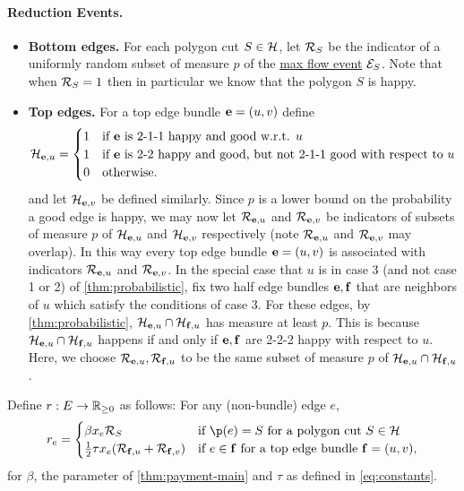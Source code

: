 \paragraph{Reduction Events.} %
\begin{itemize}
\item \textbf{Bottom edges.} \hypertarget{reduction-events}{For each polygon cut}  $S\in\mathcal{H}$, let ${\mathcal{R}}_S$ be the indicator of a uniformly random subset of measure $p$ of the \hyperlink{tar:max-flow-event}{max flow event} ${\cal E}_S$. Note that when ${\mathcal{R}}_S=1$ then in particular we know that the polygon $S$ is happy.\label{def:RS}
\item \textbf{Top edges.} \label{def:Reu} For a top edge bundle ${\bf e}=(u,v)$ define
$$\cH_{\bbe,u} = \begin{cases}
 1 & 	\text{if $\bbe$ is 2-1-1 happy and good w.r.t. } u\\
  1 & \text{if $\bbe$ is 2-2 happy and good, but not 2-1-1 good with respect to $u$} \\%
  0 & \text{otherwise.}
  \end{cases}
  $$ 
  and let $\mathcal{H}_{{\bf e},v}$ be defined similarly. Since $p$ is a lower bound on the probability a good edge is happy, we may now let ${\mathcal{R}}_{{\bf e},u}$ and ${\mathcal{R}}_{{\bf e},v}$ be indicators of subsets of measure $p$ of $\mathcal{H}_{{\bf e},u}$ and $\mathcal{H}_{{\bf e},v}$ respectively (note ${\mathcal{R}}_{{\bf e},u}$ and ${\mathcal{R}}_{{\bf e},v}$ may overlap). 
In this way every top edge bundle ${\bf e}=(u,v)$ is associated with indicators ${\mathcal{R}}_{{\bf e},u}$ and ${\mathcal{R}}_{{\bf e},v}$. In the special case that $u$ is in case 3 (and not case 1 or 2) of \cref{thm:probabilistic}, fix two half edge bundles ${\bf e},{\bf f}$ that are neighbors of $u$ which satisfy the conditions of case 3. For these edges, by \cref{thm:probabilistic}, $\mathcal{H}_{{\bf e},u} \cap \mathcal{H}_{{\bf f},u}$ has measure at least $p$. This is because $\mathcal{H}_{{\bf e},u} \cap \mathcal{H}_{{\bf f},u}$ happens if and only if ${\bf e},{\bf f}$ are 2-2-2 happy with respect to $u$. Here, we choose ${\mathcal{R}}_{{\bf e},u},{\mathcal{R}}_{{\bf f},u}$ to be the same subset of measure $p$ of $\mathcal{H}_{{\bf e},u} \cap \mathcal{H}_{{\bf f},u}$. 
\end{itemize}

Define $r:E\to\mathbb{R}_{\geq 0}$ as follows: For any (non-bundle) edge $e$,
 $$r_e = \begin{cases} 
 \beta x_e \cR_{S} & \text{if $\p(e)=S$ for a polygon cut $S\in\cH$} \\
 \frac{1}{2}\tau x_e (\cR_{\bbf,u} + \cR_{\bbf,v}) & \text{if $e\in \bbf$ for a top edge bundle $\bbf=(u,v)$},
\end{cases}$$ 
for $\beta$, the parameter of \cref{thm:payment-main} and $\tau$ as defined in \ref{eq:constants}. 

